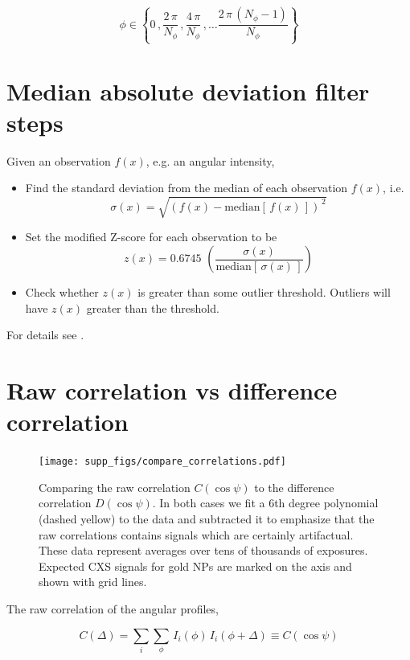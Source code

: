 \documentclass [12pt,fleqn]{article}
\def \be {\begin{equation}}
\def \ee {\end{equation}}
\begin{document}
\begin{equation}
\phi \in \left \{ 0\,, \frac{2\,\pi}{N_\phi}\,, \frac{4\,\pi}{N_\phi}\,, \dots \frac{2\,\pi\,(N_\phi-1)}{N_\phi} \right \}
\end{equation}

\section{Median absolute deviation filter steps} \label{outlier_filter}

Given an observation $f(x)$, e.g. an angular intensity, 

\begin{itemize} 
\item Find the standard deviation from the median of each observation $f(x)$, i.e. 
\be
\sigma(x) = \sqrt{ \left ( f(x) - \text{median} \left [\,f(x) \,\right ] \right) ^{\,2}}
\ee
\item Set the modified Z-score for each observation to be 
\be
z(x) = 0.6745 \,\, \left( \frac{\sigma(x)}{\text{median}\left[\,\sigma(x)\,\right]} \right )
\ee

\item Check whether $z(x)$ is greater than some outlier threshold. Outliers will have $z(x)$ greater than the threshold.
\end{itemize}

For details see \cite{iglewicz1993volume}.
  
\section{Raw correlation vs difference correlation}
\begin{figure}[H]
\texttt{[image: supp\_figs/compare\_correlations.pdf]}
\caption{Comparing the raw correlation $C(\cos \psi)$ to the difference correlation $D(\cos \psi)$. In both cases we fit a 6th degree polynomial (dashed yellow) to the data and subtracted it to emphasize that the raw correlations contains signals which are certainly artifactual. These data represent averages over tens of thousands of exposures. Expected CXS signals for gold NPs are marked on the axis and shown with grid lines.}
\label{fig:compare_correlations}
\end{figure}

The raw correlation of the angular profiles,

\be
C(\Delta) = \sum_i \sum _\phi \, I_i(\phi)\, I_i(\phi + \Delta) \equiv C(\cos \psi)
\ee
\end{document}
